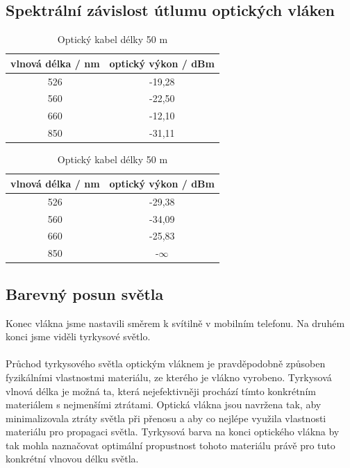 \subsection{Spektrální závislost útlumu optických vláken}

\begin{table}[!htb]
    \begin{minipage}{.5\linewidth}
      \caption{Optický kabel délky 1 m}
      \centering
        \begin{tabular}{| c | c |}
     \hline
    vlnová délka / nm & optický výkon / dBm  \\ 
     \hline
  526 & -19,28 \\ 
     \hline
  560 & -22,50 \\ 
     \hline
  660 & -12,10 \\
     \hline
  850 & -31,11 \\ 
     \hline

        \end{tabular}
    \end{minipage}%
    \begin{minipage}{.5\linewidth}
      \centering
        \caption{Optický kabel délky 50 m}
        \begin{tabular}{| c | c |}
     \hline
    vlnová délka / nm & optický výkon / dBm  \\ 
     \hline
  526 & -29,38 \\ 
     \hline
  560 & -34,09 \\ 
     \hline
  660 & -25,83 \\
     \hline
  850 & -$\infty$ \\ 
     \hline
        \end{tabular}
    \end{minipage} 
\end{table}

\subsection{Barevný posun světla}
Konec vlákna jsme nastavili směrem k svítilně v mobilním telefonu. Na druhém konci jsme viděli tyrkysové světlo. 
\\\\
Průchod tyrkysového světla optickým vláknem je pravděpodobně způsoben fyzikálními vlastnostmi materiálu, ze kterého je vlákno vyrobeno. Tyrkysová vlnová délka je možná ta, která nejefektivněji prochází tímto konkrétním materiálem s nejmenšími ztrátami. Optická vlákna jsou navržena tak, aby minimalizovala ztráty světla při přenosu a aby co nejlépe využila vlastnosti materiálu pro propagaci světla. Tyrkysová barva na konci optického vlákna by tak mohla naznačovat optimální propustnost tohoto materiálu právě pro tuto konkrétní vlnovou délku světla.



